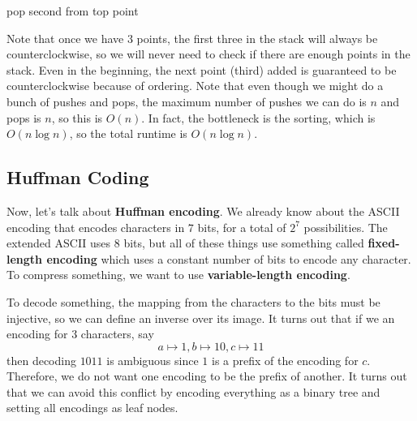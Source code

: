 \begin{example}
\begin{algorithm}[H]
\begin{algorithmic}
              \State pop second from top point 
            \EndWhile
          \EndFor 
          \State {} 
        \EndFunction
      \end{algorithmic}
    \end{algorithm}
    Note that once we have 3 points, the first three in the stack will always be counterclockwise, so we will never need to check if there are enough points in the stack. Even in the beginning, the next point (third) added is guaranteed to be counterclockwise because of ordering. Note that even though we might do a bunch of pushes and pops, the maximum number of pushes we can do is $n$ and pops is $n$, so this is $O(n)$. In fact, the bottleneck is the sorting, which is $O(n \log{n})$, so the total runtime is $O(n \log{n})$. 
  \end{example}

\subsection{Huffman Coding}

  Now, let's talk about \textbf{Huffman encoding}. We already know about the ASCII encoding that encodes characters in $7$ bits, for a total of $2^7$ possibilities. The extended ASCII uses $8$ bits, but all of these things use something called \textbf{fixed-length encoding} which uses a constant number of bits to encode any character. To compress something, we want to use \textbf{variable-length encoding}. 

  To decode something, the mapping from the characters to the bits must be injective, so we can define an inverse over its image. It turns out that if we an encoding for 3 characters, say 
  \[a \mapsto 1, b \mapsto 10, c \mapsto 11\]
  then decoding $1011$ is ambiguous since $1$ is a prefix of the encoding for $c$. Therefore, we do not want one encoding to be the prefix of another. It turns out that we can avoid this conflict by encoding everything as a binary tree and setting all encodings as leaf nodes. 

